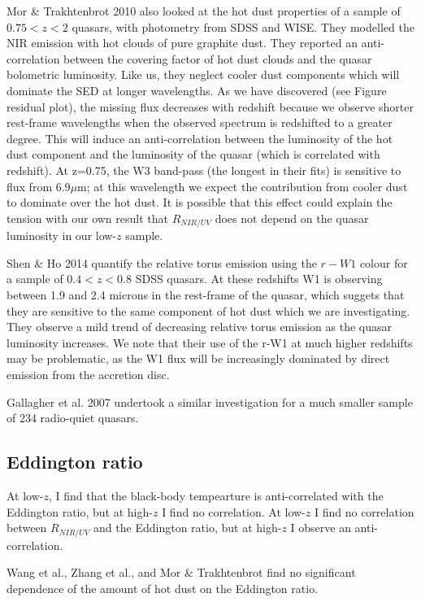 Mor \& Trakhtenbrot 2010 also looked at the hot dust properties of a sample of $0.75 < z < 2$ quasars, with photometry from SDSS and WISE. 
They modelled the NIR emission with hot clouds of pure graphite dust. 
They reported an anti-correlation between the covering factor of hot dust clouds and the quasar bolometric luminosity. 
Like us, they neglect cooler dust components which will dominate the SED at longer wavelengths. 
As we have discovered (see Figure residual plot), the missing flux decreases with redshift because we observe shorter rest-frame wavelengths when the observed spectrum is redshifted to a greater degree. 
This will induce an anti-correlation between the luminosity of the hot dust component and the luminosity of the quasar (which is correlated with redshift). 
At z=0.75, the W3 band-pass (the longest in their fits) is sensitive to flux from 6.9$\mu$m; at this wavelength we expect the contribution from cooler dust to dominate over the hot dust. 
It is possible that this effect could explain the tension with our own result that $R_{NIR/UV}$ does not depend on the quasar luminosity in our low-$z$ sample. 

Shen \& Ho 2014 quantify the relative torus emission using the $r-W1$ colour for a sample of $0.4 < z < 0.8$ SDSS quasars. 
At these redshifts W1 is observing between 1.9 and 2.4 microns in the rest-frame of the quasar, which suggets that they are sensitive to the same component of hot dust which we are investigating. 
They observe a mild trend of decreasing relative torus emission as the quasar luminosity increases. 
We note that their use of the r-W1 at much higher redshifts may be problematic, as the W1 flux will be increasingly dominated by direct emission from the accretion disc. 

Gallagher et al. 2007 undertook a similar investigation for a much smaller sample of 234 radio-quiet quasars.

\subsection{Eddington ratio}

At low-$z$, I find that the black-body tempearture is anti-correlated with the Eddington ratio, but at high-$z$ I find no correlation. 
At low-$z$ I find no correlation between $R_{NIR/UV}$ and the Eddington ratio, but at high-$z$ I observe an anti-correlation. 

Wang et al., Zhang et al., and Mor \& Trakhtenbrot find no significant dependence of the amount of hot dust on the Eddington ratio. 

